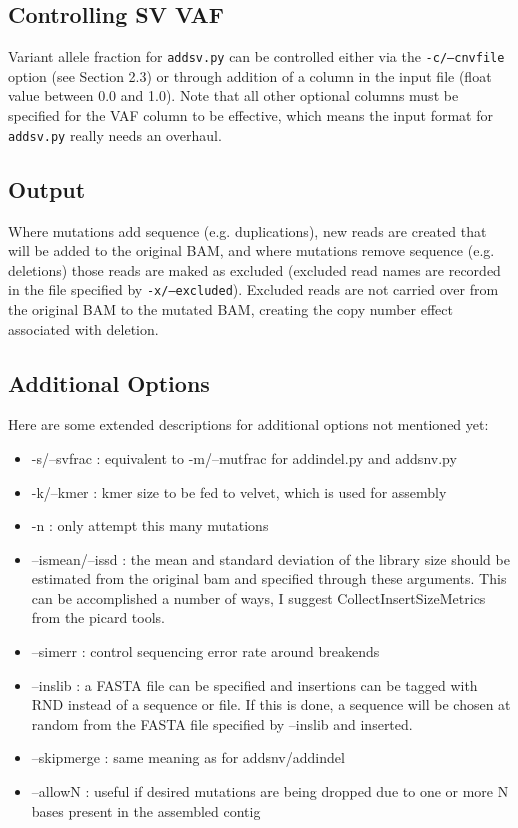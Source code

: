 \documentclass[letterpaper,11pt]{article}
\begin{document}
\subsection{Controlling SV VAF}
Variant allele fraction for \texttt{addsv.py} can be controlled either via the \texttt{-c/--cnvfile} option (see Section 2.3) or through addition of a column in the input file (float value between 0.0 and 1.0). Note that all other optional columns must be specified for the VAF column to be effective, which means the input format for \texttt{addsv.py} really needs an overhaul.

\subsection{Output}
    Where mutations add sequence (e.g. duplications), new reads are created that will be added to the original BAM, and where mutations remove sequence (e.g. deletions) those reads are maked as excluded (excluded read names are recorded in the file specified by \texttt{-x/--excluded}). Excluded reads are not carried over from the original BAM to the mutated BAM, creating the copy number effect associated with deletion.     
     
\subsection{Additional Options}
Here are some extended descriptions for additional options not mentioned yet:
     
\begin{itemize}
\item -s/--svfrac : equivalent to -m/--mutfrac for addindel.py and addsnv.py
\item -k/--kmer : kmer size to be fed to velvet, which is used for assembly
\item -n : only attempt this many mutations
\item --ismean/--issd : the mean and standard deviation of the library size should be estimated from the original bam and specified through these arguments. This can be accomplished a number of ways, I suggest CollectInsertSizeMetrics from the picard tools.
\item --simerr : control sequencing error rate around breakends
\item --inslib : a FASTA file can be specified and insertions can be tagged with RND instead of a sequence or file. If this is done, a sequence will be chosen at random from the FASTA file specified by --inslib and inserted.
\item --skipmerge : same meaning as for addsnv/addindel
\item --allowN : useful if desired mutations are being dropped due to one or more N bases present in the assembled contig
\end{itemize}
\end{document}
